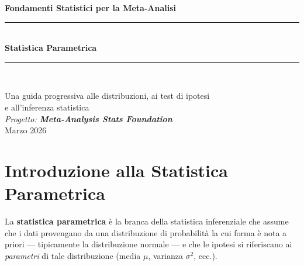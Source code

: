 \documentclass[12pt, a4paper]{article}
\begin{document}
\begin{titlepage}
  \centering
  \vspace*{2cm}

  {\Large\bfseries\color{MidnightBlue} Fondamenti Statistici per la Meta-Analisi}\\[0.5cm]
  \rule{\linewidth}{1.5pt}\\[0.3cm]
  {\Huge\bfseries Statistica Parametrica}\\[0.3cm]
  \rule{\linewidth}{1.5pt}\\[2cm]


  \vspace{1.5cm}
  {\large Una guida progressiva alle distribuzioni, ai test di ipotesi\\
  e all'inferenza statistica}\\[2cm]

  \vfill
  {\large\itshape Progetto: \textbf{Meta-Analysis Stats Foundation}}\\[0.3cm]
  {\normalsize Marzo 2026}
\end{titlepage}

\tableofcontents
\newpage

\section{Introduzione alla Statistica Parametrica}

La \textbf{statistica parametrica} è la branca della statistica inferenziale
che assume che i dati provengano da una distribuzione di probabilità la cui
forma è nota a priori — tipicamente la distribuzione normale — e che le
ipotesi si riferiscano ai \emph{parametri} di tale distribuzione
(media $\mu$, varianza $\sigma^2$, ecc.).
\end{document}

